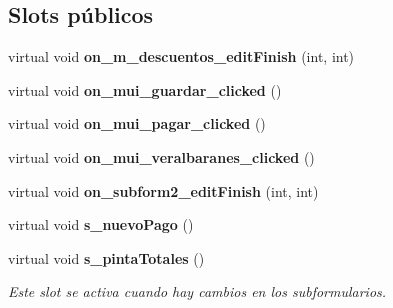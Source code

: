 \subsection*{Slots p\'{u}blicos}
\begin{CompactItemize}
\item 
virtual void {\bf on\_\-m\_\-descuentos\_\-edit\-Finish} (int, int)\label{classFacturaProveedorView_i0}

\item 
virtual void {\bf on\_\-mui\_\-guardar\_\-clicked} ()\label{classFacturaProveedorView_i1}

\item 
virtual void {\bf on\_\-mui\_\-pagar\_\-clicked} ()\label{classFacturaProveedorView_i2}

\item 
virtual void {\bf on\_\-mui\_\-veralbaranes\_\-clicked} ()\label{classFacturaProveedorView_i3}

\item 
virtual void {\bf on\_\-subform2\_\-edit\-Finish} (int, int)\label{classFacturaProveedorView_i4}

\item 
virtual void {\bf s\_\-nuevo\-Pago} ()\label{classFacturaProveedorView_i5}

\item 
virtual void {\bf s\_\-pinta\-Totales} ()\label{classFacturaProveedorView_i6}

\begin{CompactList}\small\item\em Este slot se activa cuando hay cambios en los subformularios. \item\end{CompactList}\end{CompactItemize}
